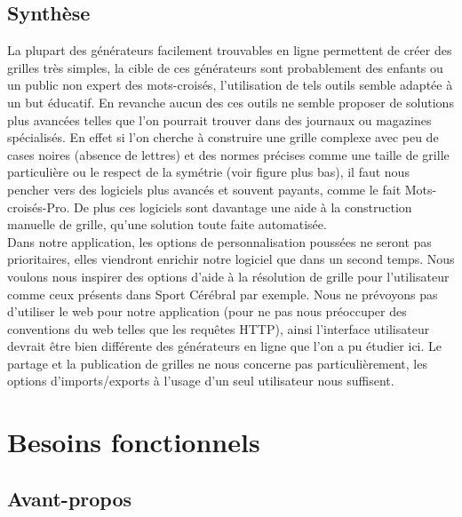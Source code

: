 \documentclass [ 11 pt ] {article}
\begin{document}
    \subsection{Synthèse}
        \hspace{1cm}La plupart des générateurs facilement trouvables en ligne permettent de créer des grilles très simples, la cible de ces générateurs sont probablement des enfants ou un public non expert des mots-croisés, l’utilisation de tels outils semble adaptée à un but éducatif. En revanche aucun des ces outils ne semble proposer de solutions plus avancées telles que l’on pourrait trouver dans des journaux ou magazines spécialisés. En effet si l’on cherche à construire une grille complexe avec peu de cases noires (absence de lettres) et des normes précises comme une taille de grille particulière ou le respect de la symétrie (voir figure plus bas), il faut nous pencher vers des logiciels plus avancés et souvent payants, comme le fait Mots-croisés-Pro. De plus ces logiciels sont davantage une aide à la construction manuelle de grille, qu’une solution toute faite automatisée.\\
        
        \hspace{1cm}Dans notre application, les options de personnalisation poussées ne seront pas prioritaires, elles viendront enrichir notre logiciel que dans un second temps.
        Nous voulons nous inspirer des options d’aide à la résolution de grille pour l’utilisateur comme ceux présents dans Sport Cérébral par exemple.
        Nous ne prévoyons pas d’utiliser le web pour notre application (pour ne pas nous préoccuper des conventions du web telles que les requêtes HTTP), ainsi l’interface utilisateur devrait être bien différente des générateurs en ligne que l’on a pu étudier ici. Le partage et la publication de grilles ne nous concerne pas particulièrement, les options d’imports/exports à l’usage d’un seul utilisateur nous suffisent.

\newpage
\section{Besoins fonctionnels} %
\subsection{Avant-propos} %
\end{document}
